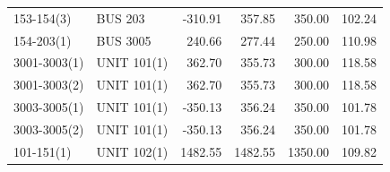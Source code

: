 \documentclass[10pt]{report}
\begin{document}
\begin{table}[H]
{\begin{tabular}{llrrrr}
153-154(3) & BUS 203 & -310.91 & 357.85 & 350.00 & 102.24 \\
154-203(1) & BUS 3005 & 240.66 & 277.44 & 250.00 & 110.98 \\
3001-3003(1) & UNIT 101(1) & 362.70 & 355.73 & 300.00 & 118.58 \\
3001-3003(2) & UNIT 101(1) & 362.70 & 355.73 & 300.00 & 118.58 \\
3003-3005(1) & UNIT 101(1) & -350.13 & 356.24 & 350.00 & 101.78 \\
3003-3005(2) & UNIT 101(1) & -350.13 & 356.24 & 350.00 & 101.78 \\
101-151(1) & UNIT 102(1) & 1482.55 & 1482.55 & 1350.00 & 109.82 \\
\bottomrule
\end{tabular}}
\end{table}
\end{document}
